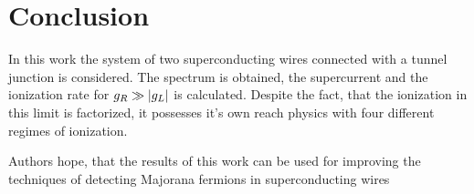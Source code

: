 \chapter{Conclusion}
\label{chap:conclision}
In this work the system of two superconducting wires connected with a tunnel junction is considered. The spectrum is obtained, the supercurrent and the ionization rate for $ g_R\gg \left|g_L\right| $ is calculated. Despite the fact, that the ionization in this limit is factorized, it possesses it's own reach physics with four different regimes of ionization.

Authors hope, that the results of this work can be used for improving the techniques of detecting Majorana fermions in superconducting wires